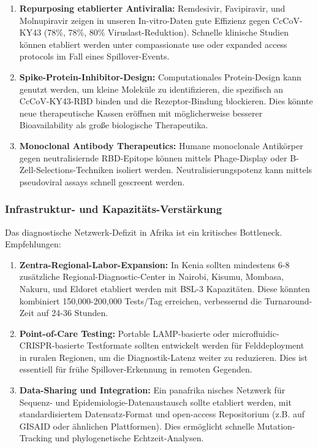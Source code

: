 ﻿\documentclass[11pt,a4paper]{article}
\theoremstyle{definition}
\begin{document}
\begin{enumerate}
\item \textbf{Repurposing etablierter Antiviralia:} Remdesivir, Favipiravir, und Molnupiravir zeigen in unseren In-vitro-Daten gute Effizienz gegen CcCoV-KY43 (78\%, 78\%, 80\% Viruslast-Reduktion). Schnelle klinische Studien können etabliert werden unter compassionate use oder expanded access protocols im Fall eines Spillover-Events.

\item \textbf{Spike-Protein-Inhibitor-Design:} Computationales Protein-Design kann genutzt werden, um kleine Moleküle zu identifizieren, die spezifisch an CcCoV-KY43-RBD binden und die Rezeptor-Bindung blockieren. Dies könnte neue therapeutische Kassen eröffnen mit möglicherweise besserer Bioavailability als große biologische Therapeutika.

\item \textbf{Monoclonal Antibody Therapeutics:} Humane monoclonale Antikörper gegen neutralisiernde RBD-Epitope können mittels Phage-Display oder B-Zell-Selections-Techniken isoliert werden. Neutralisierungspotenz kann mittels pseudoviral assays schnell gescreent werden.
\end{enumerate}

\subsubsection{Infrastruktur- und Kapazitäts-Verstärkung}

Das diagnostische Netzwerk-Defizit in Afrika ist ein kritisches Bottleneck. Empfehlungen:

\begin{enumerate}
\item \textbf{Zentra-Regional-Labor-Expansion:} In Kenia sollten mindestens 6-8 zusätzliche Regional-Diagnostic-Center in Nairobi, Kisumu, Mombasa, Nakuru, und Eldoret etabliert werden mit BSL-3 Kapazitäten. Diese könnten kombiniert 150,000-200,000 Tests/Tag erreichen, verbessernd die Turnaround-Zeit auf 24-36 Stunden.

\item \textbf{Point-of-Care Testing:} Portable LAMP-basierte oder microfluidic-CRISPR-basierte Testformate sollten entwickelt werden für Felddeployment in ruralen Regionen, um die Diagnostik-Latenz weiter zu reduzieren. Dies ist essentiell für frühe Spillover-Erkennung in remoten Gegenden.

\item \textbf{Data-Sharing und Integration:} Ein panafrika ­nisches Netzwerk für Sequenz- und Epidemio\-logie-Datenaustausch sollte etabliert werden, mit standardisiertem Datensatz-Format und open-access Repositorium (z.B. auf GISAID oder ähnlichen Plattformen). Dies ermöglicht schnelle Mutation-Tracking und phylogenetische Echtzeit-Analysen.
\end{enumerate}
\end{document}
